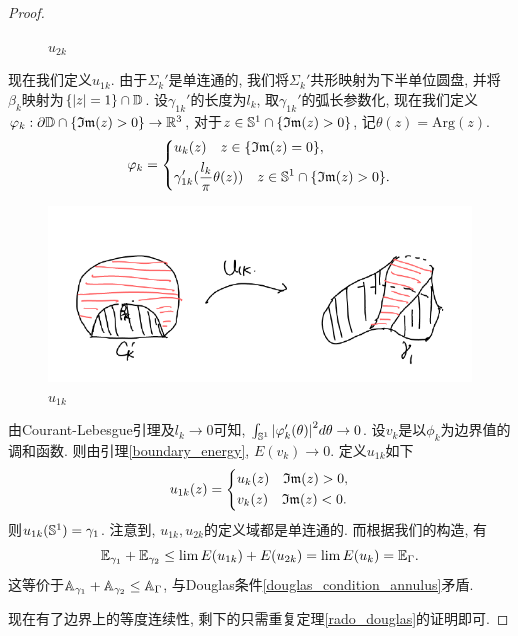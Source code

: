 \begin{proof}
\begin{claim}
\begin{subproof}
\begin{figure}[ht]
                \caption{$u_{2k}$}
                \label{u2k}
            \end{figure}
            \par  现在我们定义$u_{1k}$. 由于$\Sigma_k'$是单连通的, 我们将$\Sigma_k'$共形映射为下半单位圆盘, 并将$\beta_k$映射为$\{\abs{z}=1\} \cap \D$.  设$\gamma_{1k}'$的长度为$l_k$, 取$\gamma_{1k}'$的弧长参数化, 现在我们定义$\phi_k: \P \D \cap \{\Im(z)>0\} \to \R^3$, 对于$z \in \S^1 \cap \{\Im(z) >0\}$, 记$\theta(z)=\text{Arg}(z)$.
            \begin{equation}
                \phi_k=\left\{
                    \begin{aligned}
                        & u_k(z) \s z \in \{\Im(z)=0\}, \\
                        & \gamma_{1k}'(\frac{l_k}{\pi}\theta(z)) \s z \in \S^1 \cap \{\Im(z)>0\}.
                    \end{aligned}
                \right.
            \end{equation}
            \begin{figure}[!h]
                \centering
                \includegraphics[scale=0.8]{images/u1k.png}
                \caption{$u_{1k}$}
                \label{u1k}
            \end{figure}
            由Courant-Lebesgue引理及$l_k\to 0$可知, $\int_{\S^1} \abs{\phi_k'(\theta)}^2 d\theta \to 0$.  设$v_k$是以$\phi_k$为边界值的调和函数. 则由引理\eqref{boundary_energy}, $E(v_k) \to 0$. 定义$u_{1k}$如下
            \begin{equation}
                u_{1k}(z)=\left\{
                    \begin{aligned}
                        &u_k(z)\s \Im(z)>0, \\
                        &v_k(z)\s \Im(z) <0.
                    \end{aligned}
                \right.
            \end{equation}
            则$u_{1k}(\S^1)= \gamma_1$. 注意到, $u_{1k}, u_{2k}$的定义域都是单连通的. 而根据我们的构造, 有
            \begin{equation}
                \EE_{\gamma_1}+\EE_{\gamma_2}\le \lim E(u_{1k})+E(u_{2k})= \lim E(u_k)= \EE_{\Gamma}.
            \end{equation}
            这等价于$\AA_{\gamma_1}+\AA_{\gamma_2} \le \AA_\Gamma$, 与Douglas条件\eqref{douglas_condition_annulus}矛盾.
        \end{subproof}
    \end{claim}
    现在有了边界上的等度连续性, 剩下的只需重复定理\eqref{rado_douglas}的证明即可.
\end{proof}
